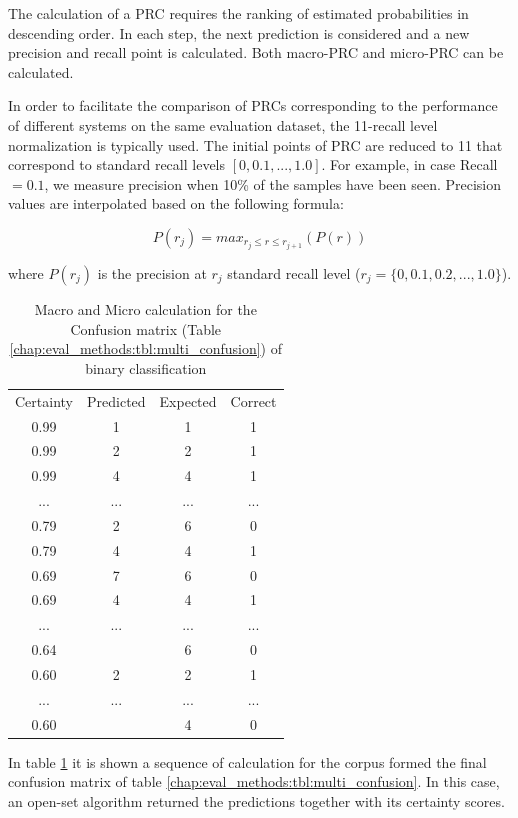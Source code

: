 The calculation of a PRC requires the ranking of estimated probabilities in descending order. In each step, the next prediction is considered and a new precision and recall point is calculated. Both macro-PRC and micro-PRC can be calculated.

In order to facilitate the comparison of PRCs corresponding to the performance of different systems on the same evaluation dataset, the 11-recall level normalization is typically used. The initial points of PRC are reduced to 11 that correspond to standard recall levels $[0,0.1,...,1.0]$. For example, in case Recall$=0.1$, we measure precision when 10\% of the samples have been seen. Precision values are interpolated based on the following formula:

\begin{equation}\label{chap:eval_methods:eq:11recall_level}
	P(r_j)=max_{r_j \leqslant r \leqslant r_{j+1}}(P(r))
\end{equation}

\noindent
where $P(r_j)$ is the precision at $r_j$ standard recall level ($r_j=\{0,0.1,0.2,...,1.0\}$).

\begin{table}[t]
	\center
	\caption{Macro and Micro calculation for the Confusion matrix (Table \ref{chap:eval_methods:tbl:multi_confusion}) of binary classification}\label{chap:eval_methods:tbl:prc}
	\begin{tabular}{|c|c|c|c|}
		\cline{1-4}
		Certainty & Predicted & Expected & Correct\\
		\cline{1-4}
		0.99 & 1 & 1 & 1 \\
		0.99 & 2 & 2 & 1 \\
		0.99 & 4 & 4 & 1 \\
		... & ... & ... & ... \\
		0.79 & 2 & 6 & 0 \\
		0.79 & 4 & 4 & 1 \\
		0.69 & 7 & 6 & 0 \\
		0.69 & 4 & 4 & 1 \\
		... & ... & ... & ... \\
		0.64 & \emptyset & 6 & 0 \\
		0.60 & 2 & 2 & 1 \\
		... & ... & ... & ... \\
		0.60 & \emptyset & 4 & 0 \\
		\cline{1-4}
	\end{tabular}
\end{table}

In table \ref{chap:eval_methods:tbl:prc} it is shown a sequence of calculation for the corpus formed the final confusion matrix of table \ref{chap:eval_methods:tbl:multi_confusion}. In this case, an open-set algorithm returned the predictions together with its certainty scores. 

